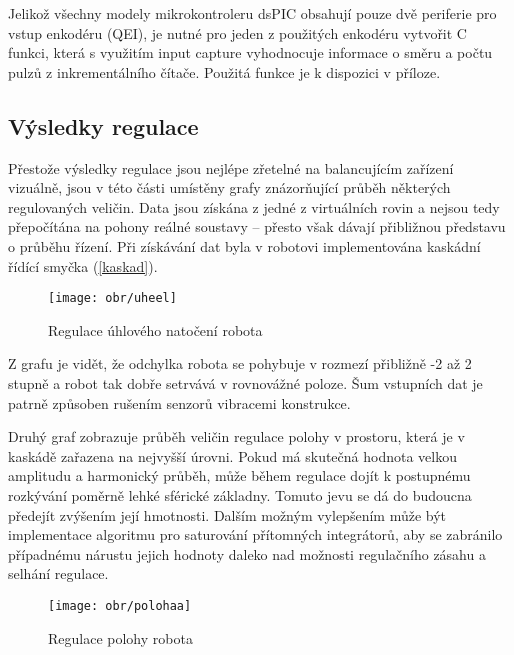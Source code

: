 Jelikož všechny modely mikrokontroleru dsPIC obsahují pouze dvě periferie pro vstup enkodéru (QEI), je nutné pro jeden z použitých enkodéru vytvořit C funkci, která s využitím input capture vyhodnocuje informace o směru a počtu pulzů z inkrementálního čítače. Použitá funkce je k dispozici v příloze.

\subsection{Výsledky regulace}
\label{vysledky}

Přestože výsledky regulace jsou nejlépe zřetelné na balancujícím zařízení vizuálně, jsou v této části umístěny grafy znázorňující průběh některých regulovaných veličin. Data jsou získána z jedné z virtuálních rovin a nejsou tedy přepočítána na pohony reálné soustavy -- přesto však dávají přibližnou představu o průběhu řízení. Při získávání dat byla v robotovi implementována kaskádní řídící smyčka (\ref{kaskad}).

\vspace{7mm}
\begin{figure}[htb]
\begin{center}
\texttt{[image: obr/uheel]}
\end{center}
\vspace{5mm}
\caption{Regulace úhlového natočení robota}
\label{real}
\end{figure}
\vspace{5mm}

\noindent Z grafu je vidět, že odchylka robota se pohybuje v rozmezí přibližně -2 až 2 stupně a robot tak dobře setrvává v rovnovážné poloze. Šum vstupních dat je patrně způsoben rušením senzorů vibracemi konstrukce.

Druhý graf zobrazuje průběh veličin regulace polohy v prostoru, která je v kaskádě zařazena na nejvyšší úrovni. Pokud má skutečná hodnota velkou amplitudu a harmonický průběh, může během regulace dojít k postupnému rozkývání poměrně lehké sférické základny. Tomuto jevu se dá do budoucna předejít zvýšením její hmotnosti. Dalším možným vylepšením může být implementace algoritmu pro saturování přítomných integrátorů, aby se zabránilo případnému nárustu jejich hodnoty daleko nad možnosti regulačního zásahu a selhání regulace.

\vspace{7mm}
\begin{figure}[htb]
\begin{center}
\texttt{[image: obr/polohaa]}
\end{center}
\vspace{5mm}
\caption{Regulace polohy robota}
\label{real}
\end{figure}
\vspace{5mm}

